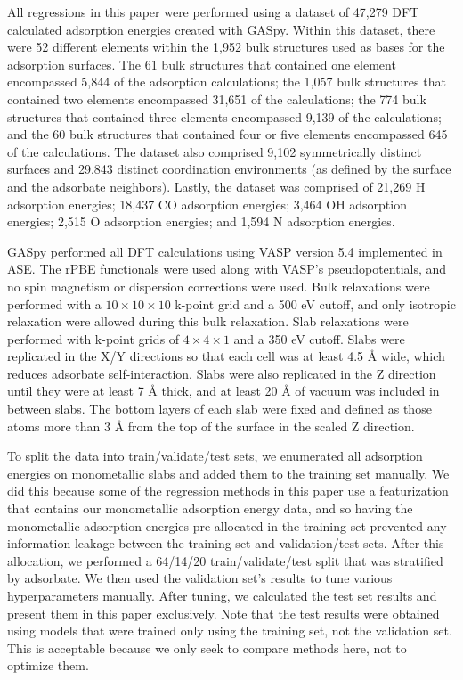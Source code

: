 \documentclass[]{achemso}
\begin{document}
All regressions in this paper were performed using a dataset of 47,279 \gls{DFT} calculated adsorption energies created with \gls{GASpy}\cite{Tran2018, Tran2018a}.
Within this dataset, there were 52 different elements within the 1,952 bulk structures used as bases for the adsorption surfaces.
The 61 bulk structures that contained one element encompassed 5,844 of the adsorption calculations; the 1,057 bulk structures that contained two elements encompassed 31,651 of the calculations; the 774 bulk structures that contained three elements encompassed 9,139 of the calculations; and the 60 bulk structures that contained four or five elements encompassed 645 of the calculations.
The dataset also comprised 9,102 symmetrically distinct surfaces and 29,843 distinct coordination environments (as defined by the surface and the adsorbate neighbors).
Lastly, the dataset was comprised of 21,269 H adsorption energies; 18,437 CO adsorption energies; 3,464 OH adsorption energies; 2,515 O adsorption energies; and 1,594 N adsorption energies.

\gls{GASpy} performed all \gls{DFT} calculations using \gls{VASP}\cite{Kresse1993, Kresse1994, Kresse1996, Kresse1996a} version 5.4 implemented in \gls{ASE}\cite{HjorthLarsen2017}.
The \gls{rPBE} functionals\cite{Hammer1999} were used along with \gls{VASP}'s pseudopotentials, and no spin magnetism or dispersion corrections were used.
Bulk relaxations were performed with a $10\times10\times10$ k-point grid and a 500 \gls{eV} cutoff, and only isotropic relaxation were allowed during this bulk relaxation.
Slab relaxations were performed with k-point grids of $4\times4\times1$ and a 350 \gls{eV} cutoff.
Slabs were replicated in the X/Y directions so that each cell was at least 4.5 \AA{} wide, which reduces adsorbate self-interaction.
Slabs were also replicated in the Z direction until they were at least 7 \AA{} thick, and at least 20 \AA{} of vacuum was included in between slabs.
The bottom layers of each slab were fixed and defined as those atoms more than 3 \AA{} from the top of the surface in the scaled Z direction.

To split the data into train/validate/test sets, we enumerated all adsorption energies on monometallic slabs and added them to the training set manually. 
We did this because some of the regression methods in this paper use a featurization that contains our monometallic adsorption energy data\cite{Tran2018}, and so having the monometallic adsorption energies pre-allocated in the training set prevented any information leakage between the training set and validation/test sets.
After this allocation, we performed a 64/14/20 train/validate/test split that was stratified\cite{Thompson2012} by adsorbate.
We then used the validation set's results to tune various hyperparameters manually.
After tuning, we calculated the test set results and present them in this paper exclusively.
Note that the test results were obtained using models that were trained only using the training set, not the validation set.
This is acceptable because we only seek to compare methods here, not to optimize them.
\end{document}

